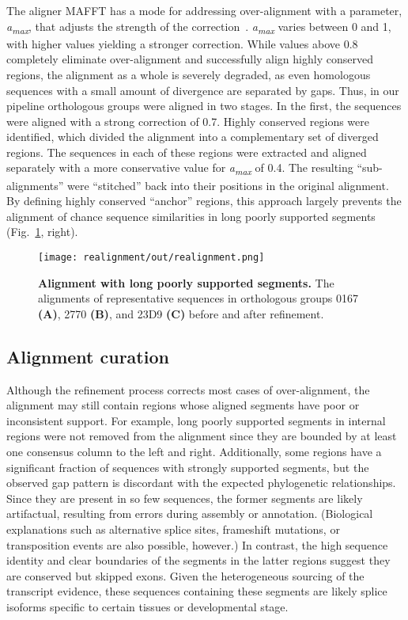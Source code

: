 The aligner MAFFT has a mode for addressing over-alignment with a parameter, \textit{a\textsubscript{max}}, that adjusts the strength of the correction~\cite{Katoh2013, Katoh2016}. \textit{a\textsubscript{max}} varies between 0 and 1, with higher values yielding a stronger correction. While values above 0.8 completely eliminate over-alignment and successfully align highly conserved regions, the alignment as a whole is severely degraded, as even homologous sequences with a small amount of divergence are separated by gaps. Thus, in our pipeline orthologous groups were aligned in two stages. In the first, the sequences were aligned with a strong correction of 0.7. Highly conserved regions were identified, which divided the alignment into a complementary set of diverged regions. The sequences in each of these regions were extracted and aligned separately with a more conservative value for \textit{a\textsubscript{max}} of 0.4. The resulting ``sub-alignments'' were ``stitched'' back into their positions in the original alignment. By defining highly conserved ``anchor'' regions, this approach largely prevents the alignment of chance sequence similarities in long poorly supported segments (Fig.~\ref{fig:realignment}, right).

\begin{figure}[h!]
\texttt{[image: realignment/out/realignment.png]}
\centering
\caption{\textbf{Alignment with long poorly supported segments.}
The alignments of representative sequences in orthologous groups 0167 \textbf{(A)}, 2770 \textbf{(B)}, and 23D9 \textbf{(C)} before and after refinement.}
\label{fig:realignment}
\end{figure}

\subsection{Alignment curation}
Although the refinement process corrects most cases of over-alignment, the alignment may still contain regions whose aligned segments have poor or inconsistent support. For example, long poorly supported segments in internal regions were not removed from the alignment since they are bounded by at least one consensus column to the left and right. Additionally, some regions have a significant fraction of sequences with strongly supported segments, but the observed gap pattern is discordant with the expected phylogenetic relationships. Since they are present in so few sequences, the former segments are likely artifactual, resulting from errors during assembly or annotation. (Biological explanations such as alternative splice sites, frameshift mutations, or transposition events are also possible, however.) In contrast, the high sequence identity and clear boundaries of the segments in the latter regions suggest they are conserved but skipped exons. Given the heterogeneous sourcing of the transcript evidence, these sequences containing these segments are likely splice isoforms specific to certain tissues or developmental stage.

